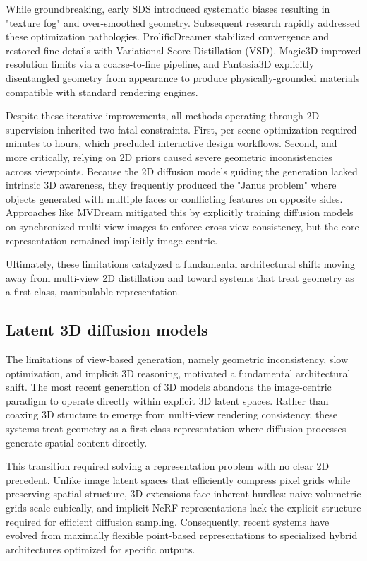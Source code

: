 While groundbreaking, early SDS introduced systematic biases resulting in "texture fog" and over-smoothed geometry. Subsequent research rapidly addressed these optimization pathologies. ProlificDreamer \cite{wang2023prolificdreamerhighfidelitydiversetextto3d} stabilized convergence and restored fine details with Variational Score Distillation (VSD). Magic3D \cite{lin2023magic3dhighresolutiontextto3dcontent} improved resolution limits via a coarse-to-fine pipeline, and Fantasia3D \cite{chen2023fantasia3ddisentanglinggeometryappearance} explicitly disentangled geometry from appearance to produce physically-grounded materials compatible with standard rendering engines.

Despite these iterative improvements, all methods operating through 2D supervision inherited two fatal constraints. First, per-scene optimization required minutes to hours, which precluded interactive design workflows. Second, and more critically, relying on 2D priors caused severe geometric inconsistencies across viewpoints. Because the 2D diffusion models guiding the generation lacked intrinsic 3D awareness, they frequently produced the "Janus problem" where objects generated with multiple faces or conflicting features on opposite sides. Approaches like MVDream \cite{shi2024mvdreammultiviewdiffusion3d} mitigated this by explicitly training diffusion models on synchronized multi-view images to enforce cross-view consistency, but the core representation remained implicitly image-centric.

Ultimately, these limitations catalyzed a fundamental architectural shift: moving away from multi-view 2D distillation and toward systems that treat geometry as a first-class, manipulable representation.

\subsection{Latent 3D diffusion models}

The limitations of view-based generation, namely geometric inconsistency, slow optimization, and implicit 3D reasoning, motivated a fundamental architectural shift. The most recent generation of 3D models abandons the image-centric paradigm to operate directly within explicit 3D latent spaces. Rather than coaxing 3D structure to emerge from multi-view rendering consistency, these systems treat geometry as a first-class representation where diffusion processes generate spatial content directly.

This transition required solving a representation problem with no clear 2D precedent. Unlike image latent spaces that efficiently compress pixel grids while preserving spatial structure, 3D extensions face inherent hurdles: naive volumetric grids scale cubically, and implicit NeRF representations lack the explicit structure required for efficient diffusion sampling. Consequently, recent systems have evolved from maximally flexible point-based representations to specialized hybrid architectures optimized for specific outputs.

